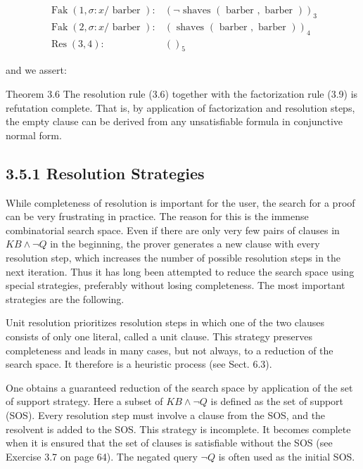 \documentclass[10pt]{article}
\begin{document}
$$
\begin{aligned}
\operatorname{Fak}(1, \sigma: x / \text { barber }): & (\neg \text { shaves }(\text { barber }, \text { barber }))_{3} \\
\operatorname{Fak}(2, \sigma: x / \text { barber }): & (\text { shaves }(\text { barber }, \text { barber }))_{4} \\
\operatorname{Res}(3,4): & ()_{5}
\end{aligned}
$$

and we assert:

Theorem 3.6 The resolution rule (3.6) together with the factorization rule (3.9) is refutation complete. That is, by application of factorization and resolution steps, the empty clause can be derived from any unsatisfiable formula in conjunctive normal form.

\subsection*{3.5.1 Resolution Strategies}
While completeness of resolution is important for the user, the search for a proof can be very frustrating in practice. The reason for this is the immense combinatorial search space. Even if there are only very few pairs of clauses in $K B \wedge \neg Q$ in the beginning, the prover generates a new clause with every resolution step, which increases the number of possible resolution steps in the next iteration. Thus it has long been attempted to reduce the search space using special strategies, preferably without losing completeness. The most important strategies are the following.


Unit resolution prioritizes resolution steps in which one of the two clauses consists of only one literal, called a unit clause. This strategy preserves completeness and leads in many cases, but not always, to a reduction of the search space. It therefore is a heuristic process (see Sect. 6.3).

One obtains a guaranteed reduction of the search space by application of the set of support strategy. Here a subset of $K B \wedge \neg Q$ is defined as the set of support (SOS). Every resolution step must involve a clause from the SOS, and the resolvent is added to the SOS. This strategy is incomplete. It becomes complete when it is ensured that the set of clauses is satisfiable without the SOS (see Exercise 3.7 on page 64). The negated query $\neg Q$ is often used as the initial SOS.
\end{document}
